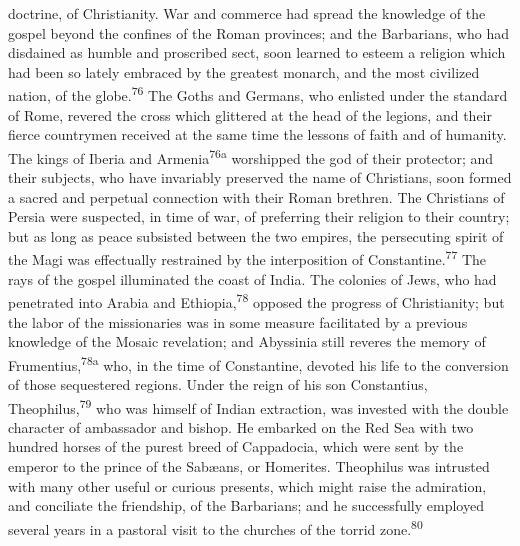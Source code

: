 doctrine, of Christianity. War and commerce had spread the knowledge of
the gospel beyond the confines of the Roman provinces; and the
Barbarians, who had disdained as humble and proscribed sect, soon
learned to esteem a religion which had been so lately embraced by the
greatest monarch, and the most civilized nation, of the globe.\textsuperscript{76} The
Goths and Germans, who enlisted under the standard of Rome, revered the
cross which glittered at the head of the legions, and their fierce
countrymen received at the same time the lessons of faith and of
humanity. The kings of Iberia and Armenia\textsuperscript{76a} worshipped the god of
their protector; and their subjects, who have invariably preserved the
name of Christians, soon formed a sacred and perpetual connection with
their Roman brethren. The Christians of Persia were suspected, in time
of war, of preferring their religion to their country; but as long as
peace subsisted between the two empires, the persecuting spirit of the
Magi was effectually restrained by the interposition of Constantine.\textsuperscript{77}
The rays of the gospel illuminated the coast of India. The colonies of
Jews, who had penetrated into Arabia and Ethiopia,\textsuperscript{78} opposed the
progress of Christianity; but the labor of the missionaries was in some
measure facilitated by a previous knowledge of the Mosaic revelation;
and Abyssinia still reveres the memory of Frumentius,\textsuperscript{78a} who, in the
time of Constantine, devoted his life to the conversion of those
sequestered regions. Under the reign of his son Constantius,
Theophilus,\textsuperscript{79} who was himself of Indian extraction, was invested with
the double character of ambassador and bishop. He embarked on the Red
Sea with two hundred horses of the purest breed of Cappadocia, which
were sent by the emperor to the prince of the Sabæans, or Homerites.
Theophilus was intrusted with many other useful or curious presents,
which might raise the admiration, and conciliate the friendship, of the
Barbarians; and he successfully employed several years in a pastoral
visit to the churches of the torrid zone.\textsuperscript{80}



